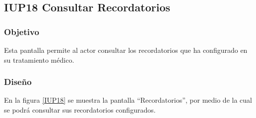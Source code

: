\subsection{IUP18 Consultar Recordatorios}
 
\subsubsection{Objetivo}

    Esta pantalla permite al actor consultar los recordatorios que ha configurado en su tratamiento médico.

\subsubsection{Diseño}

    En la figura \ref{IUP18} se muestra la pantalla ``Recordatorios'', por medio de la cual se podrá consultar sus recordatorios configurados. \\


%
%
